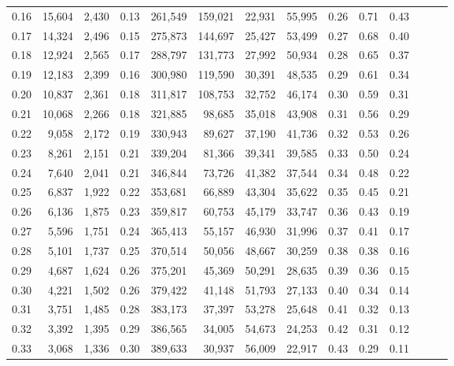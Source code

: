 \begin{tabular}{rrrrrrrrrrrrrr}
0.16 &  15,604 &  2,430 &  0.13 &  261,549 &  159,021 &  22,931 &  55,995 &  0.26 &  0.71 &      0.43 \\
0.17 &  14,324 &  2,496 &  0.15 &  275,873 &  144,697 &  25,427 &  53,499 &  0.27 &  0.68 &      0.40 \\
0.18 &  12,924 &  2,565 &  0.17 &  288,797 &  131,773 &  27,992 &  50,934 &  0.28 &  0.65 &      0.37 \\
0.19 &  12,183 &  2,399 &  0.16 &  300,980 &  119,590 &  30,391 &  48,535 &  0.29 &  0.61 &      0.34 \\
0.20 &  10,837 &  2,361 &  0.18 &  311,817 &  108,753 &  32,752 &  46,174 &  0.30 &  0.59 &      0.31 \\
0.21 &  10,068 &  2,266 &  0.18 &  321,885 &   98,685 &  35,018 &  43,908 &  0.31 &  0.56 &      0.29 \\
0.22 &   9,058 &  2,172 &  0.19 &  330,943 &   89,627 &  37,190 &  41,736 &  0.32 &  0.53 &      0.26 \\
0.23 &   8,261 &  2,151 &  0.21 &  339,204 &   81,366 &  39,341 &  39,585 &  0.33 &  0.50 &      0.24 \\
0.24 &   7,640 &  2,041 &  0.21 &  346,844 &   73,726 &  41,382 &  37,544 &  0.34 &  0.48 &      0.22 \\
0.25 &   6,837 &  1,922 &  0.22 &  353,681 &   66,889 &  43,304 &  35,622 &  0.35 &  0.45 &      0.21 \\
0.26 &   6,136 &  1,875 &  0.23 &  359,817 &   60,753 &  45,179 &  33,747 &  0.36 &  0.43 &      0.19 \\
0.27 &   5,596 &  1,751 &  0.24 &  365,413 &   55,157 &  46,930 &  31,996 &  0.37 &  0.41 &      0.17 \\
0.28 &   5,101 &  1,737 &  0.25 &  370,514 &   50,056 &  48,667 &  30,259 &  0.38 &  0.38 &      0.16 \\
0.29 &   4,687 &  1,624 &  0.26 &  375,201 &   45,369 &  50,291 &  28,635 &  0.39 &  0.36 &      0.15 \\
0.30 &   4,221 &  1,502 &  0.26 &  379,422 &   41,148 &  51,793 &  27,133 &  0.40 &  0.34 &      0.14 \\
0.31 &   3,751 &  1,485 &  0.28 &  383,173 &   37,397 &  53,278 &  25,648 &  0.41 &  0.32 &      0.13 \\
0.32 &   3,392 &  1,395 &  0.29 &  386,565 &   34,005 &  54,673 &  24,253 &  0.42 &  0.31 &      0.12 \\
0.33 &   3,068 &  1,336 &  0.30 &  389,633 &   30,937 &  56,009 &  22,917 &  0.43 &  0.29 &      0.11 \\

\end{tabular}
